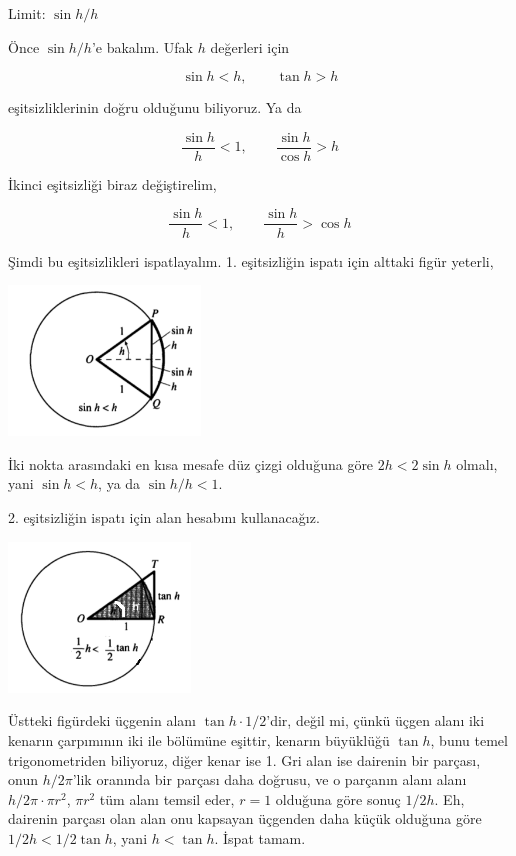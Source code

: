 \documentclass[12pt,fleqn]{article}\usepackage{../../common}
\begin{document}
Limit: $\sin h / h$

Önce $\sin h / h$'e bakalım. Ufak $h$ değerleri için 

$$ \sin h < h, \qquad \tan h > h $$

eşitsizliklerinin doğru olduğunu biliyoruz. Ya da

$$ \frac{\sin h}{h} < 1, \qquad  \frac{\sin h}{\cos h} > h $$

İkinci eşitsizliği biraz değiştirelim,

$$ \frac{\sin h}{h} < 1, \qquad  \frac{\sin h}{h} > \cos h $$

Şimdi bu eşitsizlikleri ispatlayalım. 1. eşitsizliğin ispatı için alttaki
figür yeterli,

\includegraphics[height=4cm]{calc_multi_app_01.png}

İki nokta arasındaki en kısa mesafe düz çizgi olduğuna göre $2h < 2\sin h$
olmalı, yani $\sin h < h$, ya da $\sin h / h < 1$.

2. eşitsizliğin ispatı için alan hesabını kullanacağız. 

\includegraphics[height=4cm]{calc_multi_app_02.png}

Üstteki figürdeki üçgenin alanı $\tan h \cdot 1 / 2$'dir, değil mi, çünkü
üçgen alanı iki kenarın çarpımının iki ile bölümüne eşittir, kenarın
büyüklüğü $\tan h$, bunu temel trigonometriden biliyoruz, diğer kenar ise
1. Gri alan ise dairenin bir parçası, onun $h/2\pi$'lik oranında bir
parçası daha doğrusu, ve o parçanın alanı alanı $h/2\pi \cdot \pi r^2$,
$\pi r^2$ tüm alanı temsil eder, $r=1$ olduğuna göre sonuç $1/2 h$. Eh,
dairenin parçası olan alan onu kapsayan üçgenden daha küçük olduğuna göre
$1/2 h < 1/2 \tan h$, yani $h < \tan h$. İspat tamam.
\end{document}
